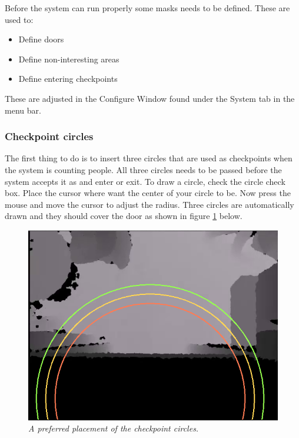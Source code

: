 Before the system can run properly some masks needs to be defined. These are used to:

\begin{itemize}
\item Define doors
\item Define non-interesting areas
\item Define entering checkpoints
\end{itemize}

These are adjusted in the Configure Window found under the System tab in the menu bar.

\subsubsection{Checkpoint circles}
The first thing to do is to insert three circles that are used as checkpoints when the system is counting people. All three circles needs to be passed before the system accepts it as and enter or exit. To draw a circle, check the circle check box. Place the cursor where want the center of your circle to be. Now press the mouse and move the cursor to adjust the radius. Three circles are automatically drawn and they should cover the door as shown in figure \ref{fig:circlePlacement} below.

\begin{figure}[H]
	\centering
	\includegraphics[width=\linewidth]{images/Manual2.png}
	\caption[Circle placment]{\textit{A preferred placement of the checkpoint circles. }}
	\label{fig:circlePlacement}  %
\end{figure}

